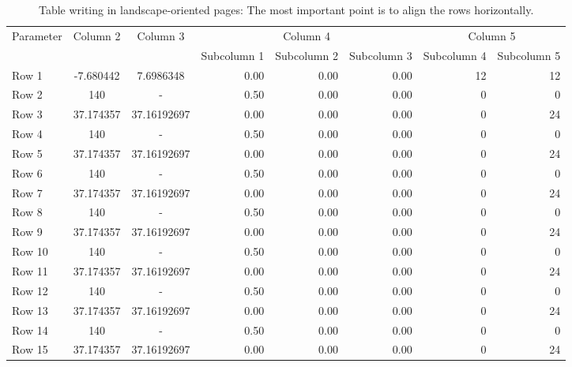 \begin{landscape}
\thispagestyle{empty}

\begin{table}[!ht]
\vspace{-6mm}
{\setlength{\tabcolsep}{14pt}
\renewcommand{\arraystretch}{1.1} %
\caption{Table writing in landscape-oriented pages:
The most important point is to align the rows horizontally.}
\begin{center}
\vspace{-6mm}
\begin{tabular}{|l|c|c|r|r|r|r|r|}
\hline
\multirow{2}{*}{Parameter} & \multirow{2}{*}{Column 2} & \multirow{2}{*}{Column 3} & \multicolumn{3}{|c|}{Column 4} & \multicolumn{2}{|c|}{Column 5}\\ \cline{4-8}
  & & & Subcolumn 1 & Subcolumn 2 & Subcolumn 3 & Subcolumn 4 & Subcolumn 5 \\
\hline
Row 1 & -7.680442 & 7.6986348 & 0.00 & 0.00 & 0.00 & 12 & 12 \\
Row 2 & 140 & - & 0.50 & 0.00 & 0.00 & 0 & 0 \\
Row 3 & 37.174357 & 37.16192697 & 0.00 & 0.00 & 0.00 & 0 & 24 \\
Row 4 & 140 & - & 0.50 & 0.00 & 0.00 & 0 & 0 \\
Row 5 & 37.174357 & 37.16192697 & 0.00 & 0.00 & 0.00 & 0 & 24 \\
Row 6 & 140 & - & 0.50 & 0.00 & 0.00 & 0 & 0 \\
Row 7 & 37.174357 & 37.16192697 & 0.00 & 0.00 & 0.00 & 0 & 24 \\
Row 8 & 140 & - & 0.50 & 0.00 & 0.00 & 0 & 0 \\
Row 9 & 37.174357 & 37.16192697 & 0.00 & 0.00 & 0.00 & 0 & 24 \\
Row 10 & 140 & - & 0.50 & 0.00 & 0.00 & 0 & 0 \\
Row 11 & 37.174357 & 37.16192697 & 0.00 & 0.00 & 0.00 & 0 & 24 \\
Row 12 & 140 & - & 0.50 & 0.00 & 0.00 & 0 & 0 \\
Row 13 & 37.174357 & 37.16192697 & 0.00 & 0.00 & 0.00 & 0 & 24 \\
Row 14 & 140 & - & 0.50 & 0.00 & 0.00 & 0 & 0 \\
Row 15 & 37.174357 & 37.16192697 & 0.00 & 0.00 & 0.00 & 0 & 24 \\
\hline
\end{tabular}
\end{center}
\begin{center}
      \vspace{40mm}     %
      \hspace{0cm}\pageref{table:landscape_table1}
      \label{table:landscape_table1}
\end{center}
}
\end{table}
\end{landscape}

